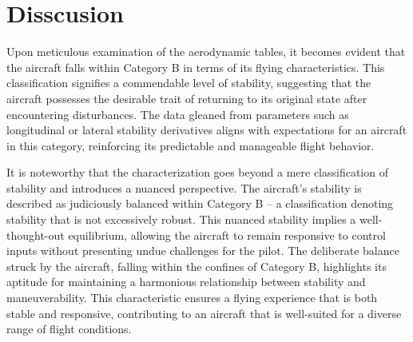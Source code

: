\documentclass[a4paper, twoside]{article}
\begin{document}
\section{Disscusion}
Upon meticulous examination of the aerodynamic tables, it becomes evident that the aircraft falls within Category B in terms of its flying characteristics. This classification signifies a commendable level of stability, suggesting that the aircraft possesses the desirable trait of returning to its original state after encountering disturbances. The data gleaned from parameters such as longitudinal or lateral stability derivatives aligns with expectations for an aircraft in this category, reinforcing its predictable and manageable flight behavior.

It is noteworthy that the characterization goes beyond a mere classification of stability and introduces a nuanced perspective. 
The aircraft's stability is described as judiciously balanced within Category B –
 a classification denoting stability that is not excessively robust. This nuanced stability implies a well-thought-out equilibrium, 
 allowing the aircraft to remain responsive to control inputs without presenting undue challenges for the pilot. 
 The deliberate balance struck by the aircraft, falling within the confines of Category B, 
 highlights its aptitude for maintaining a harmonious relationship between stability and maneuverability. 
 This characteristic ensures a flying experience that is both stable and responsive, contributing to an aircraft that is well-suited 
 for a diverse range of flight conditions.

\end{document}
